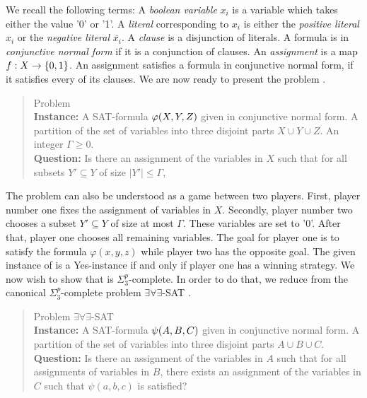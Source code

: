 We recall the following terms: 
A \emph{boolean variable} $x_i$ is a variable which takes either the value '0' or '1'. 
A \emph{literal} corresponding to $x_i$ is either the \emph{positive literal} $x_i$ or the \emph{negative literal} $\overline{x_i}$. A \emph{clause} is a disjunction of literals.
 A formula is in \emph{conjunctive normal form} if it is a conjunction of clauses. 
 An \emph{assignment} is a map $f : X \rightarrow \{ 0,1 \}$. An assignment satisfies a formula in conjunctive normal form, if it satisfies every of its clauses. 
 We are now ready to present the problem {\radj}.


\begin{quote}
Problem {\radj}
\\
\textbf{Instance:}  A SAT-formula $\varphi(X,Y,Z)$ given in conjunctive normal form. A partition of the set of variables into three disjoint parts $X \cup Y \cup Z$. An integer $\Gamma \geq 0$.  
\\
\textbf{Question:} Is there an assignment  of the variables in $X$ such that for all subsets $Y' \subseteq Y$ of size $|Y'| \leq \Gamma$, 
\end{quote}

The problem {\radj} can also be understood as a game between two players. 
First, player number one fixes the assignment of variables in $X$. 
Secondly, player number two chooses a subset $Y' \subseteq Y$ of size at most $\Gamma$. 
These variables are set to '0'. 
After that, player one chooses all remaining variables. 
The goal for player one is to satisfy the formula $\varphi(x,y,z)$ while player two has the opposite goal. 
The given instance of {\radj} is a Yes-instance if and only if player one has a winning strategy. 
We now wish to show that {\radj} is $\Sigma_3^p$-complete. 
In order to do that, we reduce from the canonical $\Sigma_3^p$-complete problem $\exists\forall\exists$-SAT \cite{stockmeyer1976polynomial}.
\begin{quote}
Problem $\exists\forall\exists$-SAT
\\
\textbf{Instance:}  A SAT-formula $\psi(A,B,C)$ given in conjunctive normal form. A partition of the set of variables into three disjoint parts $A \cup B \cup C$.
\\
\textbf{Question:} Is there an assignment  of the variables in $A$ such that for all assignments  of variables in $B$, there exists an assignment  of the variables in $C$ such that $\psi(a,b,c)$ is satisfied?
\end{quote}


